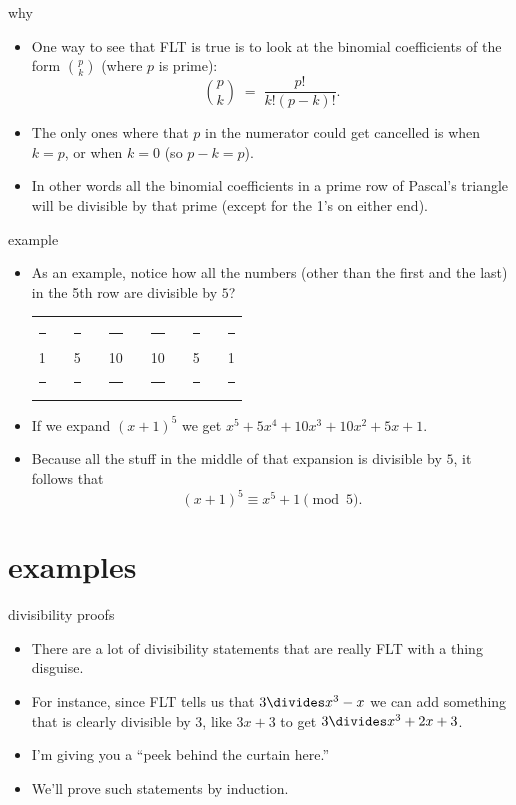 \documentclass[handout,landscape]{beamer}
\begin{document}
\begin{frame}{why}
\begin{itemize}
\item One way to see that FLT is true is to look at the binomial coefficients of the form $\binom{p}{k}$ (where $p$ is prime):
\[ \binom{p}{k} \; = \; \frac{ p! }{k! (p-k)!} . \] \pause
\item The only ones where that $p$ in the numerator could get cancelled is when $k=p$, or when $k=0$ (so $p-k = p$). \pause
\item In other words all the binomial coefficients in a prime row of Pascal's triangle will be divisible by that prime (except for the 1's on either end). \pause
\end{itemize}

\end{frame}

\begin{frame}{example}
\begin{itemize}

\item As an example, notice how all the numbers (other than the first and the last) in the 5th row are divisible by $5$? \pause \newline

\begin{tabular}{ccccccccccc}
\rule{6pt}{0pt} 1 \rule{6pt}{0pt}& &\rule{6pt}{0pt} 5 \rule{6pt}{0pt}& & \rule{6pt}{0pt}10\rule{6pt}{0pt} & & \rule{6pt}{0pt}10 \rule{6pt}{0pt}& & \rule{6pt}{0pt}5\rule{6pt}{0pt} & & \rule{6pt}{0pt}1\rule{6pt}{0pt} \\
\end{tabular}
\pause

\vspace{.2in}

\item If we expand $(x+1)^5$ we get $x^5 + 5x^4 + 10x^3 + 10x^2 + 5x +1$. \pause
\item Because all the stuff in the middle of that expansion is divisible by $5$, it follows that
\[ (x+1)^5 \equiv x^5 + 1 \pmod{5}. \] 
\end{itemize}
\end{frame}

\section{examples}

\begin{frame}{divisibility proofs}
\begin{itemize}
\item There are a lot of divisibility statements that are really FLT with a thing disguise.
\item For instance, since FLT tells us that $3 \divides x^3 - x$ we can add something that is clearly divisible by 3, like $3x+3$ to get $3 \divides x^3 + 2x + 3$.\pause
\item I'm giving you a ``peek behind the curtain here.'' \pause
\item We'll prove such statements by induction.
\end{itemize}
\end{frame}
\end{document}
